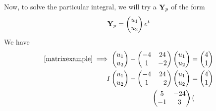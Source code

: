 Now, to solve the particular integral, we will try a \(\vb Y_p\) of the form
\[
	\vb Y_p = \begin{pmatrix}
		u_1 \\ u_2
	\end{pmatrix} e^t
\]
We have
\begin{align*}
	\eqref{matrixexample} \implies \begin{pmatrix}
		                               u_1 \\ u_2
	                               \end{pmatrix} - \begin{pmatrix}
		                                               -4 & 24 \\ 1 & -2
	                                               \end{pmatrix}\begin{pmatrix}
		                                                            u_1 \\ u_2
	                                                            \end{pmatrix} & = \begin{pmatrix}
		                                                                              4 \\ 1
	                                                                              \end{pmatrix} \\
	I\begin{pmatrix}
		 u_1 \\ u_2
	 \end{pmatrix} - \begin{pmatrix}
		                 -4 & 24 \\ 1 & -2
	                 \end{pmatrix}\begin{pmatrix}
		                              u_1 \\ u_2
	                              \end{pmatrix}                & = \begin{pmatrix}
		                                                               4 \\ 1
	                                                               \end{pmatrix}                \\
	\begin{pmatrix}
		5 & -24 \\ -1 & 3
	\end{pmatrix}\begin{pmatrix}

\end{pmatrix}
\end{align*}
